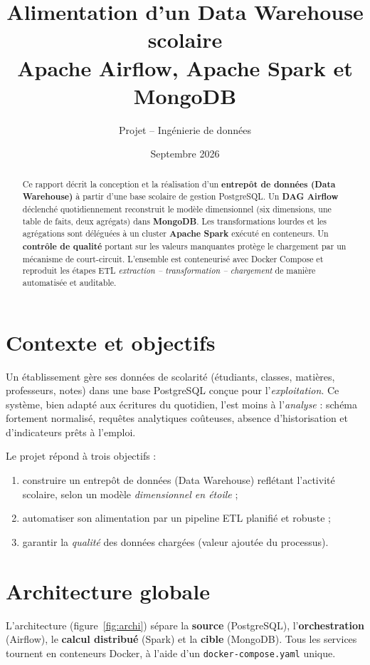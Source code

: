 ﻿\documentclass[10pt,a4paper]{article}
\title{\textbf{Alimentation d'un Data Warehouse scolaire}\\%
{\large Apache Airflow, Apache Spark et MongoDB}}
\author{Projet -- Ingénierie de données}
\date{Septembre 2026}
\begin{document}
\sloppy

\maketitle
\vspace{-2.2em}

\begin{abstract}
\noindent Ce rapport décrit la conception et la réalisation d'un \textbf{entrepôt de données (Data
Warehouse)} à partir d'une base scolaire de gestion PostgreSQL. Un \textbf{DAG Airflow} déclenché
quotidiennement reconstruit le modèle dimensionnel (six dimensions, une table de faits, deux
agrégats) dans \textbf{MongoDB}. Les transformations lourdes et les agrégations sont déléguées à un
cluster \textbf{Apache Spark} exécuté en conteneurs. Un \textbf{contrôle de qualité} portant sur les
valeurs manquantes protège le chargement par un mécanisme de court-circuit. L'ensemble est
conteneurisé avec Docker Compose et reproduit les étapes ETL \emph{extraction -- transformation --
chargement} de manière automatisée et auditable.
\end{abstract}

\section{Contexte et objectifs}\label{sec:contexte}
Un établissement gère ses données de scolarité (étudiants, classes, matières, professeurs,
notes) dans une base PostgreSQL conçue pour l'\emph{exploitation}. Ce système, bien adapté aux
écritures du quotidien, l'est moins à l'\emph{analyse} : schéma fortement normalisé, requêtes
analytiques coûteuses, absence d'historisation et d'indicateurs prêts à l'emploi.

Le projet répond à trois objectifs :
\begin{enumerate}
  \item construire un entrepôt de données (Data Warehouse) reflétant l'activité scolaire, selon
        un modèle \emph{dimensionnel en étoile} ;
  \item automatiser son alimentation par un pipeline ETL planifié et robuste ;
  \item garantir la \emph{qualité} des données chargées (valeur ajoutée du processus).
\end{enumerate}

\section{Architecture globale}\label{sec:architecture}
L'architecture (figure~\ref{fig:archi}) sépare la \textbf{source} (PostgreSQL), l'\textbf{orchestration}
(Airflow), le \textbf{calcul distribué} (Spark) et la \textbf{cible} (MongoDB). Tous les services
tournent en conteneurs Docker, à l'aide d'un \texttt{docker-compose.yaml} unique.
\end{document}
